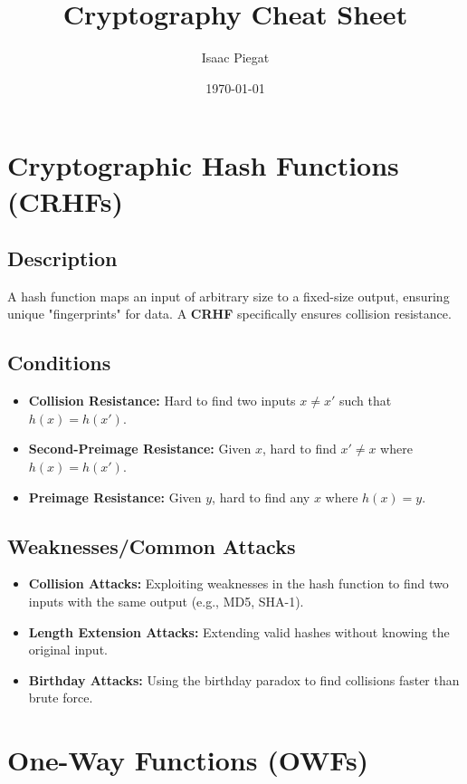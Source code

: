 \documentclass[12pt]{article}
\title{Cryptography Cheat Sheet}
\author{Isaac Piegat}
\date{\today}
\begin{document}
\maketitle

\section*{Cryptographic Hash Functions (CRHFs)}
\subsection*{Description}
A hash function maps an input of arbitrary size to a fixed-size output, ensuring unique "fingerprints" for data. A \textbf{CRHF} specifically ensures collision resistance.

\subsection*{Conditions}
\begin{itemize}
    \item \textbf{Collision Resistance:} Hard to find two inputs \(x \neq x'\) such that \(h(x) = h(x')\).
    \item \textbf{Second-Preimage Resistance:} Given \(x\), hard to find \(x' \neq x\) where \(h(x) = h(x')\).
    \item \textbf{Preimage Resistance:} Given \(y\), hard to find any \(x\) where \(h(x) = y\).
\end{itemize}

\subsection*{Weaknesses/Common Attacks}
\begin{itemize}
    \item \textbf{Collision Attacks:} Exploiting weaknesses in the hash function to find two inputs with the same output (e.g., MD5, SHA-1).
    \item \textbf{Length Extension Attacks:} Extending valid hashes without knowing the original input.
    \item \textbf{Birthday Attacks:} Using the birthday paradox to find collisions faster than brute force.
\end{itemize}

\section*{One-Way Functions (OWFs)}
\end{document}
